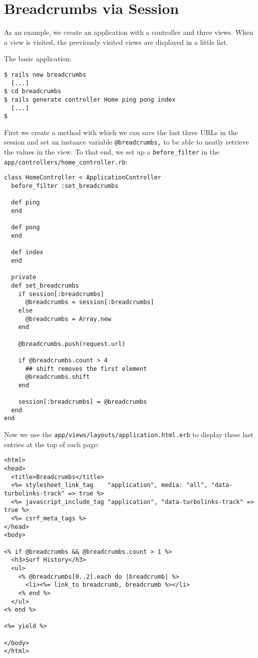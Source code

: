 \documentclass[a4paper]{book}
\begin{document}
\section{Breadcrumbs via Session}\label{breadcrumbs-via-session}

As an example, we create an application with a controller and three views. When a view is visited, the previously visited views are displayed in a little list.

The basic application:

\begin{shaded}\begin{verbatim}
$ rails new breadcrumbs
  [...]
$ cd breadcrumbs
$ rails generate controller Home ping pong index
  [...]
$
\end{verbatim}\end{shaded}

First we create a method with which we can save the last three URLs in the session and set an instance variable \texttt{@breadcrumbs,} to be able to neatly retrieve the values in the view. To that end, we set up a \texttt{before\_filter} in the \texttt{app/controllers/home\_controller.rb}:

\begin{shaded}\begin{verbatim}
class HomeController < ApplicationController
  before_filter :set_breadcrumbs

  def ping
  end

  def pong
  end

  def index
  end

  private
  def set_breadcrumbs
    if session[:breadcrumbs]
      @breadcrumbs = session[:breadcrumbs]
    else
      @breadcrumbs = Array.new
    end

    @breadcrumbs.push(request.url)

    if @breadcrumbs.count > 4
      ## shift removes the first element
      @breadcrumbs.shift
    end

    session[:breadcrumbs] = @breadcrumbs
  end
end
\end{verbatim}\end{shaded}

Now we use the \texttt{app/views/layouts/application.html.erb} to display these last entries at the top of each page:

\begin{shaded}\begin{verbatim}
<html>
<head>
  <title>Breadcrumbs</title>
  <%= stylesheet_link_tag    "application", media: "all", "data-turbolinks-track" => true %>
  <%= javascript_include_tag "application", "data-turbolinks-track" => true %>
  <%= csrf_meta_tags %>
</head>
<body>

<% if @breadcrumbs && @breadcrumbs.count > 1 %>
  <h3>Surf History</h3>
  <ul>
    <% @breadcrumbs[0..2].each do |breadcrumb| %>
      <li><%= link_to breadcrumb, breadcrumb %></li>
    <% end %>
  </ul>
<% end %>

<%= yield %>

</body>
</html>
\end{verbatim}\end{shaded}
\end{document}
